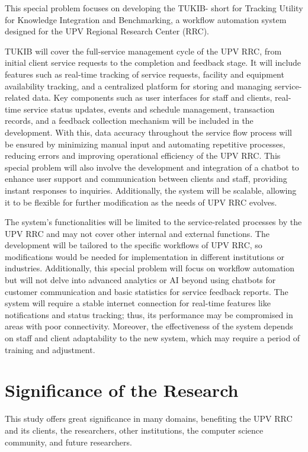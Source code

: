 This special problem focuses on developing the TUKIB- short for Tracking Utility for Knowledge Integration and Benchmarking, a workflow automation system designed for the UPV Regional Research Center (RRC). 

TUKIB will cover the full-service management cycle of the UPV RRC, from initial client service requests to the completion and feedback stage. It will include features such as real-time tracking of service requests, facility and equipment availability tracking, and a centralized platform for storing and managing service-related data. Key components such as user interfaces for staff and clients, real-time service status updates, events and schedule management, transaction records, and a feedback collection mechanism will be included in the development. With this, data accuracy throughout the service flow process will be ensured by minimizing manual input and automating repetitive processes, reducing errors and improving operational efficiency of the UPV RRC. This special problem will also involve the development and integration of a chatbot to enhance user support and communication between clients and staff, providing instant responses to inquiries. Additionally, the system will be scalable, allowing it to be flexible for further modification as the needs of UPV RRC evolves.

The system’s functionalities will be limited to the service-related processes by the UPV RRC and may not cover other internal and external functions. The development will be tailored to the specific workflows of UPV RRC, so modifications would be needed for implementation in different institutions or industries. Additionally, this special problem will focus on workflow automation but will not delve into advanced analytics or AI beyond using chatbots for customer communication and basic statistics for service feedback reports. The system will require a stable internet connection for real-time features like notifications and status tracking; thus, its performance may be compromised in areas with poor connectivity. Moreover, the effectiveness of the system depends on staff and client adaptability to the new system, which may require a period of training and adjustment.


\section{Significance of the Research}
\label{sec:significance}

This study offers great significance in many domains, benefiting the UPV RRC and its clients, the researchers, other institutions, the computer science community, and future researchers.

